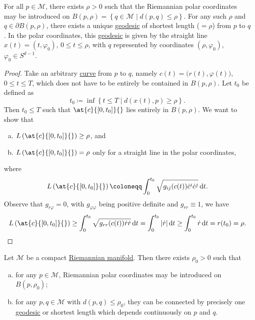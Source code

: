 \begin{theorem}\label{thm:shortest-geodesic}
	For all \(p\in \mathcal{M} \), there exists \(\rho > 0\) such that the Riemannian polar coordinates may be introduced on \(B(p, \rho ) = \left\{ q\in \mathcal{M} \mid d(p, q) \leq \rho \right\} \). For any such \(\rho \) and \(q\in \partial B(p, \rho )\), there exists a unique \hyperref[def:geodesic]{geodesic} of shortest length (\(=\rho \)) from \(p\) to \(q\). In the polar coordinates, this \hyperref[def:geodesic]{geodesic} is given by the straight line \(x(t) = (t, \varphi _0)\), \(0 \leq t \leq \rho \), with \(q\) represented by coordinates \((\rho , \varphi _0)\), \(\varphi _0\in S^{d-1}\).
\end{theorem}
\begin{proof}
	Take an arbitrary \hyperref[def:curve]{curve} from \(p\) to \(q\), namely \(c(t) = \big(r(t), \varphi (t)\big)\), \(0 \leq t \leq T\), which does not have to be entirely be contained in \(B(p, \rho )\). Let \(t_0\) be defined as
	\[
		t_0 \coloneqq \inf \left\{ t \leq T \mid d(x(t), p) \geq \rho \right\}.
	\]
	Then \(t_0 \leq T\) such that \(\at{c}{[0, t_0]}{} \) lies entirely in \(B(p, \rho )\). We want to show that
	\begin{enumerate}[(a)]
		\item \(L\left( \at{c}{[0, t_0]}{} \right) \geq \rho \), and
		\item \(L\left( \at{c}{[0, t_0]}{} \right) = \rho \) only for a straight line in the polar coordinates,
	\end{enumerate}
	where
	\[
		L\left( \at{c}{[0 ,t_0]}{} \right) \coloneqq \int_{0}^{t_0} \sqrt{g_{ij}(c(t)) \dot{c}^i \dot{c}^j} \,\mathrm{d}t.
	\]
	Observe that \(g_{r \varphi } = 0\), with \(g_{\varphi \varphi }\) being positive definite and \(g_{r r} \equiv 1\), we have
	\[
		L\left( \at{c}{[0, t_0]}{} \right)
		\geq \int_{0}^{t_0} \sqrt{g_{r r}(c(t)) \dot{r} \dot{r}} \,\mathrm{d}t
		= \int_{0}^{t_0} \vert \dot{r} \vert \,\mathrm{d}t
		\geq \int_{0}^{t_0} \dot{r} \,\mathrm{d}t
		= r(t_0)
		= \rho.
	\]
\end{proof}

\begin{corollary}\label{col:shortest-geodesic}
	Let \(\mathcal{M} \) be a compact \hyperref[def:Riemannian-manifold]{Riemannian manifold}. Then there exists \(\rho _0 > 0\) such that
	\begin{enumerate}[(a)]
		\item for any \(p\in \mathcal{M} \), Riemannian polar coordinates may be introduced on \(B(p, \rho _0)\);
		\item for any \(p, q\in \mathcal{M} \) with \(d(p, q) \leq \rho _0\), they can be connected by precisely one \hyperref[def:geodesic]{geodesic} or shortest length which depends continuously on \(p\) and \(q\).
	\end{enumerate}
\end{corollary}